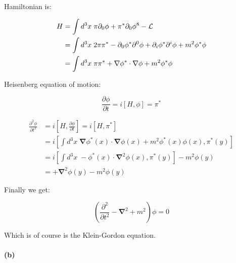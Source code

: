 \documentclass[11pt]{article}
\begin{document}
Hamiltonian is:

\begin{equation}
\begin{split}
H & =
  \int d^3x \; \pi \partial_0 \phi + \pi^* \partial_0 \phi^8 -
    {\cal{L}} \\
  & =
  \int d^3x \; 2 \pi \pi^* - \partial_0 \phi^* \partial^0 \phi +
    \partial_i \phi^* \partial^i \phi + m^2 \phi^* \phi \\
  & = \int d^3x \; \pi \pi^* +
    \mathbf{\nabla} \phi^* \cdot \mathbf{\nabla} \phi +
    m^2 \phi^* \phi
\end{split}
\end{equation}

Heisenberg equation of motion:

\begin{equation}
\frac{\partial \phi}{\partial t} = i [ H, \phi ] =
  \pi^*
\end{equation}

\begin{equation}
\begin{split}
\frac{\partial^2 \phi}{\partial t^2} & =
  i[ H, \frac{\partial \phi}{\partial t} ] =
  i[ H, \pi^*] \\
  & = i \left[
    \int d^3x \;
      \mathbf{\nabla} \phi^*(x) \cdot \mathbf{\nabla} \phi(x) +
      m^2 \phi^*(x) \phi(x),
    \pi^*(y) \right] \\
  & = i \left[
    \int d^3x \;
      -\phi^*(x) \cdot \mathbf{\nabla}^2 \phi(x),
    \pi^*(y) \right] - m^2 \phi(y) \\
  & = + \mathbf{\nabla}^2 \phi(y) - m^2 \phi(y)
\end{split}
\end{equation}

Finally we get:

\begin{equation}
\left( \frac{\partial^2}{\partial t^2} - \mathbf{\nabla}^2 +
  m^2 \right) \phi = 0
\end{equation}

Which is of course is the Klein-Gordon equation.

\paragraph*{(b)}
\end{document}
